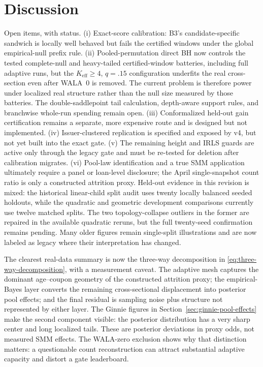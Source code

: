 \documentclass[11pt]{article}
\begin{document}
\section{Discussion}\label{sec:discussion}

Open items, with status. (i) Exact-score calibration: B3's candidate-specific
sandwich is locally well behaved but fails the certified windows under the global
empirical-null prefix rule. (ii) Pooled-permutation direct BH now controls the tested
complete-null and heavy-tailed certified-window batteries, including full adaptive runs,
but the $K_{\mathrm{eff}}\ge4$, $q=.15$ configuration underfits the real cross-section even
after WALA~0 is removed. The current problem is therefore power under localized real
structure rather than the null size measured by those batteries. The double-saddlepoint
tail calculation, depth-aware support rules, and branchwise whole-run spending remain
open. (iii) Conformalized held-out gain certification remains a separate, more expensive
route and is designed but not implemented. (iv) Issuer-clustered replication is specified
and exposed by v4, but not yet built into the exact gate. (v) The remaining height and IRLS
guards are active only through the legacy gate and must be re-tested for deletion after
calibration migrates. (vi) Pool-law identification and a true SMM application ultimately
require a panel or loan-level disclosure; the April single-snapshot count ratio is only a
constructed attrition proxy. Held-out evidence in
this revision is mixed: the historical linear-child split audit uses twenty locally balanced seeded
holdouts, while the quadratic and geometric development comparisons currently use twelve matched
splits. The two topology-collapse outliers in the former are repaired in the available quadratic
reruns, but the full twenty-seed confirmation remains pending. Many older figures remain single-split
illustrations and are now labeled as legacy where their interpretation has changed.

The clearest real-data summary is now the three-way decomposition in
\eqref{eq:three-way-decomposition}, with a measurement caveat. The adaptive mesh captures the
dominant age--coupon geometry of the constructed attrition proxy; the empirical-Bayes layer converts
the remaining cross-sectional displacement into posterior pool effects; and the final residual is
sampling noise plus structure not represented by either layer. The Ginnie figures in
Section~\ref{sec:ginnie-pool-effects} make the second component visible: the posterior distribution
has a very sharp center and long localized tails. These are posterior deviations in proxy odds, not
measured SMM effects. The WALA-zero exclusion shows why that distinction matters: a questionable
count reconstruction can attract substantial adaptive capacity and distort a gate leaderboard.
\end{document}
